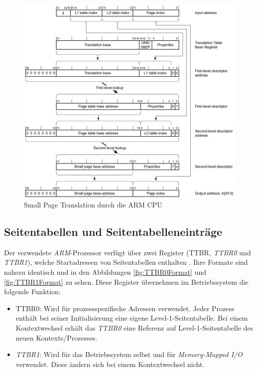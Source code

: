 \begin{figure}[H]
	\includegraphics[scale=0.8]{chapters/mmu/figures/smallPageTranslation}
	\caption{Small Page Translation durch die ARM CPU \cite[S. B3-1337]{ARM:ARM}}
	\label{fig:smallPageTranslation}
\end{figure}

\subsection{Seitentabellen und Seitentabelleneinträge}
\label{subsect:pageTables}

Der verwendete \textit{ARM}-Prozessor verfügt über zwei Register (\acf{TTBR}, \textit{TTBR0} und \textit{TTBR1}), welche Startadressen von Seitentabellen enthalten  \cite[S. B3-1320]{ARM:ARM}. Ihre Formate sind nahezu identisch und in den Abbildungen \ref{fig:TTBR0Format} und \ref{fig:TTBR1Format} zu sehen. Diese Register übernehmen im Betriebssystem die folgende Funktion:

\begin{itemize}
	\item TTBR0: Wird für prozessspezifische Adressen verwendet. Jeder Prozess enthält bei seiner Initialisierung eine eigene Level-1-Seitentabelle. Bei einem Kontextwechsel erhält das \textit{TTBR0} eine Referenz auf Level-1-Seitentabelle des neuen Kontexts/Prozesses.
	\item \textit{TTBR1}: Wird für das Betriebssystem selbst und für \textit{Memory-Mapped I/O} verwendet. Diese ändern sich bei einem Kontextwechsel nicht.
\end{itemize}


